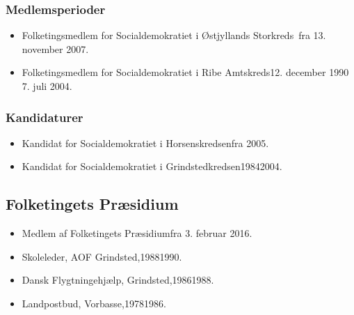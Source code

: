 \documentclass[11pt, a4paper]{awesome-cv}
\begin{document}
\begin{cvletter}
\subsubsection*{Medlemsperioder}
\begin{itemize}
\item Folketingsmedlem for Socialdemokratiet i Østjyllands Storkreds fra 13. november 2007.
\item Folketingsmedlem for Socialdemokratiet i Ribe Amtskreds12. december 1990  7. juli 2004.
\end{itemize}
\subsubsection*{Kandidaturer}
\begin{itemize}
\item Kandidat for Socialdemokratiet i Horsenskredsenfra 2005.
\item Kandidat for Socialdemokratiet i Grindstedkredsen19842004.
\end{itemize}
\subsection*{Folketingets Præsidium}
\begin{itemize}
\item Medlem af Folketingets Præsidiumfra 3. februar 2016.
\end{itemize}
\begin{itemize}
\item Skoleleder, AOF Grindsted,19881990.
\item Dansk Flygtningehjælp, Grindsted,19861988.
\item Landpostbud, Vorbasse,19781986.
\end{itemize}
\end{cvletter}
\end{document}
